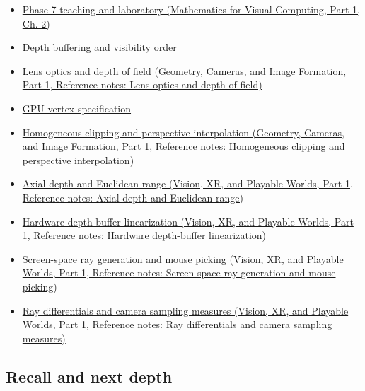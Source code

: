 \hypertarget{appendix-1c07d64f5e70-used-by}{}

\begin{itemize}
\item
  \href{../02-Mathematics-for-Visual-Computing-P01/main.pdf\#01-foundations-i-ch018-keep-the-promises-visible-while-moving-between-representations}{Phase 7 teaching and laboratory (Mathematics for Visual Computing, Part 1, Ch. 2)}
\item
  \hyperref[appendix-97578ed97952]{Depth buffering and visibility order}
\item
  \href{../03-Geometry-Cameras-and-Image-Formation-P01/main.pdf\#appendix-21f8456e2629}{Lens optics and depth of field (Geometry, Cameras, and Image Formation, Part 1, Reference notes: Lens optics and depth of field)}
\item
  \hyperref[appendix-749ba51a6c25]{GPU vertex specification}
\item
  \href{../03-Geometry-Cameras-and-Image-Formation-P01/main.pdf\#appendix-40426e4b2103}{Homogeneous clipping and perspective interpolation (Geometry, Cameras, and Image Formation, Part 1, Reference notes: Homogeneous clipping and perspective interpolation)}
\item
  \href{../07-Vision-XR-and-Playable-Worlds-P01/main.pdf\#appendix-cac01ebeeb11}{Axial depth and Euclidean range (Vision, XR, and Playable Worlds, Part 1, Reference notes: Axial depth and Euclidean range)}
\item
  \href{../07-Vision-XR-and-Playable-Worlds-P01/main.pdf\#appendix-1bc40b08db4a}{Hardware depth-buffer linearization (Vision, XR, and Playable Worlds, Part 1, Reference notes: Hardware depth-buffer linearization)}
\item
  \href{../07-Vision-XR-and-Playable-Worlds-P01/main.pdf\#appendix-f1a6d43e80d1}{Screen-space ray generation and mouse picking (Vision, XR, and Playable Worlds, Part 1, Reference notes: Screen-space ray generation and mouse picking)}
\item
  \href{../07-Vision-XR-and-Playable-Worlds-P01/main.pdf\#appendix-8c40fad29462}{Ray differentials and camera sampling measures (Vision, XR, and Playable Worlds, Part 1, Reference notes: Ray differentials and camera sampling measures)}
\end{itemize}

\subsection{Recall and next depth}\label{appendix-1c07d64f5e70-recall-and-next-depth}


